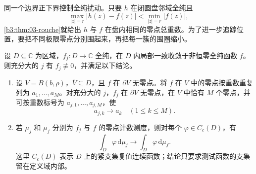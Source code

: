 \ProseParagraphBreak

同一个边界正下界控制全纯扰动。只要 \(h\) 在闭圆盘邻域全纯且
\[
 \max_{|z|=r}|h(z)-f(z)|
 <\min_{|z|=r}|f(z)|,
\]
\cref{b3:thm:03-rouche}就给出 \(h\) 与 \(f\) 在盘内相同的零点总重数。为了进一步追踪位置，要把不同极限零点分别围起来，再把每一簇的围圈缩小。

\begin{proposition}[零点簇与零点测度的稳定性]\label{b3:prop:18-zero-stability}
设 \(D\subseteq\mathbb C\) 为区域，\(f_j:D\to\mathbb C\) 全纯，在 \(D\) 内局部一致收敛于非恒零全纯函数 \(f\)。则充分大的 \(j\) 有 \(f_j\not\equiv0\)，并满足以下结论。
\begin{enumerate}
\item\label{b3:item:18-local-clusters}设 \(V=B(b,\rho)\)，\(\overline V\subseteq D\)，且 \(f\) 在 \(\partial V\) 无零点。将 \(f\) 在 \(V\) 中的零点按重数重复列为 \(a_1,\ldots,a_M\)。对充分大的 \(j\)，\(f_j\) 在 \(\partial V\) 无零点，在 \(V\) 中恰有 \(M\) 个零点，并可按重数标号为 \(a_{j,1},\ldots,a_{j,M}\)，使
\[
 a_{j,k}\longrightarrow a_k\quad(1\le k\le M).
\]
\item\label{b3:item:18-measure-stability}若 \(\mu_j\) 和 \(\mu_f\) 分别为 \(f_j\) 与 \(f\) 的零点计数测度，则对每个 \(\varphi\in C_c(D)\)，有
\[
 \int_D\varphi\,\mathrm d\mu_j
 \longrightarrow\int_D\varphi\,\mathrm d\mu_f.
\]
这里 \(C_c(D)\) 表示 \(D\) 上的紧支集复值连续函数；结论只要求测试函数的支集留在定义域内部。
\end{enumerate}
\end{proposition}
